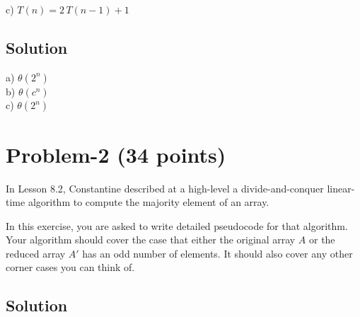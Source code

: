 \documentclass[11pt]{article}
\begin{document}
c) $T(n) = 2 \, T(n-1) + 1$


\subsection*{Solution}

a) $\theta(2^n)$\\
b) $\theta(c^n)$\\
c) $\theta(2^n)$

\newpage
\section*{Problem-2 (34 points)}
\noindent
In Lesson 8.2, Constantine described at a high-level a divide-and-conquer linear-time algorithm to compute the majority element of an array. 

In this exercise, you are asked to write detailed pseudocode for that algorithm. Your algorithm should cover the case that either the original array $A$ or the reduced array $A'$ has an odd number of elements. It should also cover any other corner cases you can think of. 


\subsection*{Solution}
\end{document}
